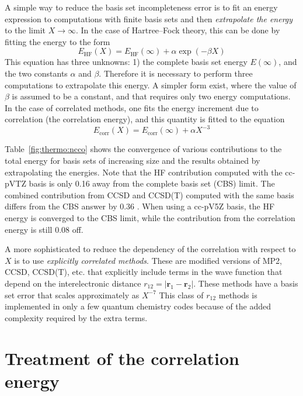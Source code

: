 \documentclass[../Main/chem371-notes.tex]{subfiles}
\begin{document}
A simple way to reduce the basis set incompleteness error is to fit an energy expression to computations with finite basis sets and then \emph{extrapolate the energy} to the limit $X \rightarrow \infty$.
In the case of Hartree--Fock theory, this can be done by fitting the energy to the form
\begin{equation}
E_\mathrm{HF}(X) = E_\mathrm{HF}(\infty) + \alpha \exp(-\beta X)
\end{equation}
This equation has three unknowns: 1) the complete basis set energy $E(\infty)$, and the two constants $\alpha$ and $\beta$.
Therefore it is necessary to perform three computations to extrapolate this energy.
A simpler form exist, where the value of $\beta$ is assumed to be a constant, and that requires only two energy computations.
In the case of correlated methods, one fits the energy increment due to correlation (the correlation energy), and this quantity is fitted to the equation
\begin{equation}
E_\mathrm{corr}(X) = E_\mathrm{corr}(\infty) + \alpha X^{-3}
\end{equation}


Table~\ref{fig:thermo:ncco} shows the convergence of various contributions to the total energy for basis sets of increasing size and the results obtained by extrapolating the energies.
Note that the HF contribution computed with the cc-pVTZ basis is only 0.16 \kcal away from the complete basis set (CBS) limit.
The combined contribution from CCSD and CCSD(T) computed with the same basis differs from the CBS answer by 0.36 \kcal.
When using a cc-pV5Z basis, the HF energy is converged to the CBS limit, while the contribution from the correlation energy is still 0.08 \kcal off.


A more sophisticated to reduce the dependency of the correlation with respect to $X$ is to use \emph{explicitly correlated methods}. These are modified versions of MP2, CCSD, CCSD(T), etc. that explicitly include terms in the wave function that depend on the interelectronic distance $r_{12} = | \mathbf{r}_1 - \mathbf{r}_2|$. These methods have a basis set error that scales approximately as $X^{-7}$
This class of $r_{12}$ methods is implemented in only a few quantum chemistry codes because of the added complexity required by the extra terms.

\section{Treatment of the correlation energy}
\end{document}
